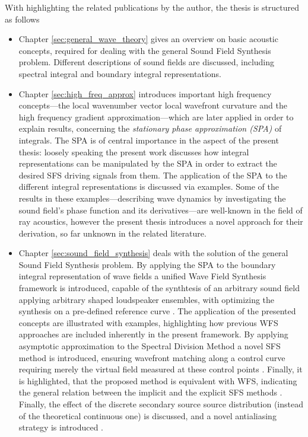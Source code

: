 With highlighting the related publications by the author, the thesis is structured as follows
\begin{itemize}
\item Chapter \ref{sec:general_wave_theory} gives an overview on basic acoustic concepts, required for dealing with the general Sound Field Synthesis problem.
Different descriptions of sound fields are discussed, including spectral integral and boundary integral representations.
%
\item Chapter \ref{sec:high_freq_approx} introduces important high frequency concepts---the local wavenumber  vector local wavefront curvature and the high frequency gradient approximation---which are later applied in order to explain results, concerning the \emph{stationary phase approximation (SPA)} of integrals.
The SPA is of central importance in the aspect of the present thesis: loosely speaking the present work discusses how integral representations can be manipulated by the SPA in order to extract the desired SFS driving signals from them.
The application of the SPA to the different integral representations is discussed via examples.
Some of the results in these examples---describing wave dynamics by investigating the sound field's phase function and its derivatives---are well-known in the field of ray acoustics, however the present thesis introduces a novel approach for their derivation, so far unknown in the related literature.
%
\item Chapter \ref{sec:sound_field_synthesis} deals with the solution of the general Sound Field Synthesis problem.
By applying the SPA to the boundary integral representation of wave fields	 a unified Wave Field Synthesis framework is introduced, capable of the synthtesis of an arbitrary sound field applying arbitrary shaped loudspeaker ensembles, with optimizing the synthesis on a pre-defined reference curve \cite{Firtha2016, schultz2017wave}.
The application of the presented concepts are illustrated with examples, highlighting how previous WFS approaches are included inherently in the present framework.
By applying asymptotic approximation to the Spectral Division Method a novel SFS method is introduced, ensuring wavefront matching along a control curve requiring merely the virtual field measured at these control points \cite{Firtha2017:daga}.
Finally, it is highlighted, that the proposed method is equivalent with WFS, indicating the general relation between the implicit and the explicit SFS methods \cite{Firtha2018:WFS_vs_SDM}.
Finally, the effect of the discrete secondary source source distribution (instead of the theoretical continuous one) is discussed, and a novel antialiasing strategy is introduced \cite{Firtha2018_daga_a}.

\end{itemize}
